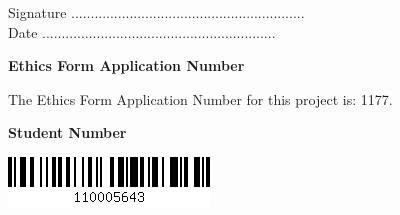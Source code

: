 \vspace{2em}
Signature ............................................................  \\

\vspace{1em}
Date ............................................................ \\

\begin{center}
    {\LARGE\bf Ethics Form Application Number}
    
The Ethics Form Application Number for this project is: 1177. 
\end{center}

\vspace{5em}
\begin{center}
    {\LARGE\bf Student Number}

\includegraphics[scale=0.6]{Images/crh13-barcode.png}
\end{center}


